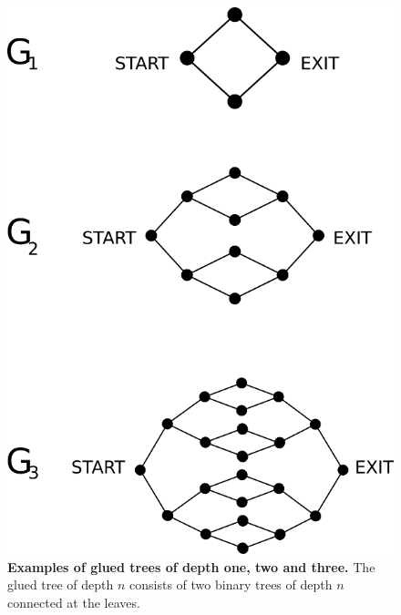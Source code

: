 \documentclass[11pt,oneside,final]{huthesis}%
\begin{document}
\begin{figure}[htb]
	\begin{center}
	\includegraphics{./figures/g123.png}
	\end{center}
	\caption{\textbf{Examples of glued trees of depth one, two and three.}  The glued tree of depth $n$ consists of two binary trees of depth $n$ connected at the leaves.}
	\label{fig:trees}
\end{figure}
\end{document}
